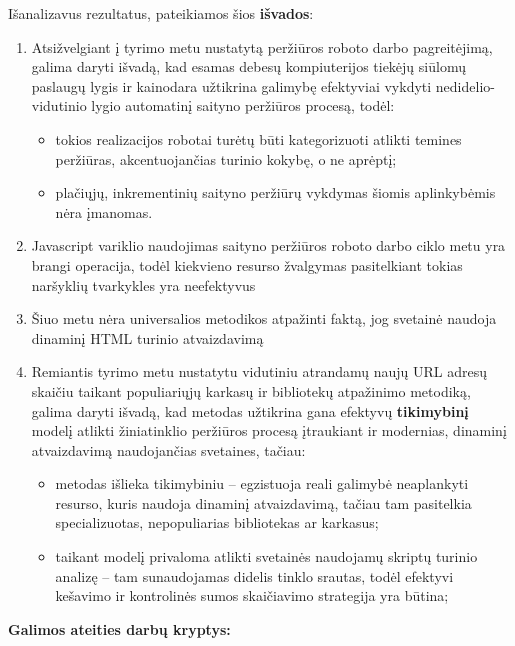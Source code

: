 
Išanalizavus rezultatus, pateikiamos šios \textbf{išvados}:

\begin{enumerate}
    \item Atsižvelgiant į tyrimo metu nustatytą peržiūros roboto darbo pagreitėjimą, galima daryti išvadą, kad esamas debesų kompiuterijos tiekėjų siūlomų paslaugų lygis ir kainodara užtikrina galimybę efektyviai vykdyti nedidelio-vidutinio lygio automatinį saityno peržiūros procesą, todėl:
    \begin{itemize}
        \item tokios realizacijos robotai turėtų būti kategorizuoti atlikti temines peržiūras, akcentuojančias turinio kokybę, o ne aprėptį;
        \item plačiųjų, inkrementinių saityno peržiūrų vykdymas šiomis aplinkybėmis nėra įmanomas.
    \end{itemize}
    
    \item Javascript variklio naudojimas saityno peržiūros roboto darbo ciklo metu yra brangi operacija, todėl kiekvieno resurso žvalgymas pasitelkiant tokias naršyklių tvarkykles yra neefektyvus 
    
    \item Šiuo metu nėra universalios metodikos atpažinti faktą, jog svetainė naudoja dinaminį HTML turinio atvaizdavimą
    
    \item Remiantis tyrimo metu nustatytu vidutiniu atrandamų naujų URL adresų skaičiu taikant populiariųjų karkasų ir bibliotekų atpažinimo metodiką, galima daryti išvadą, kad metodas užtikrina gana efektyvų \textbf{tikimybinį} modelį atlikti žiniatinklio peržiūros procesą įtraukiant ir modernias, dinaminį atvaizdavimą naudojančias svetaines, tačiau:
    \begin{itemize}
        \item metodas išlieka tikimybiniu -- egzistuoja reali galimybė neaplankyti resurso, kuris naudoja dinaminį atvaizdavimą, tačiau tam pasitelkia specializuotas, nepopuliarias bibliotekas ar karkasus;
        \item taikant modelį privaloma atlikti svetainės naudojamų skriptų turinio analizę -- tam sunaudojamas didelis tinklo srautas, todėl efektyvi kešavimo ir kontrolinės sumos skaičiavimo strategija yra būtina;
    \end{itemize}
\end{enumerate}

\textbf{Galimos ateities darbų kryptys:}

